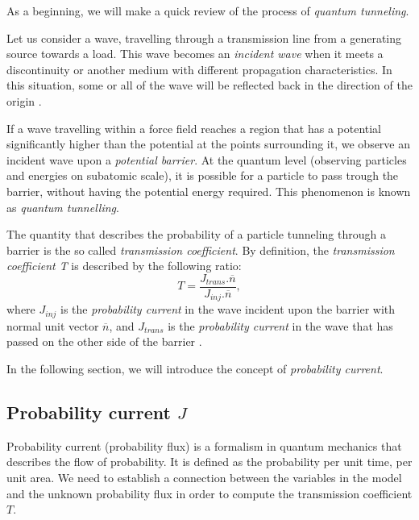 \documentclass[12pt,a4paper,onecolumn]{article}
\theoremstyle{definition}
\theoremstyle{plain}
\begin{document}
As a beginning, we  will make a quick review of the process of \textit{quantum tunneling}.

Let us consider a wave, travelling through a transmission line from a generating source towards a load. This wave becomes an \textit{incident wave} when it meets a discontinuity or another medium with different propagation characteristics. In this situation, some or all of the wave will be reflected back in the direction of the origin \cite{IncidentWave}.

If a wave travelling within a force field reaches a region that has a potential significantly higher than the potential at the points surrounding it, we observe an incident wave upon a \textit{potential barrier}. At the quantum level (observing particles and energies on subatomic scale), it is possible for a particle to pass trough the barrier, without having the potential energy required. This phenomenon is known as \textit{quantum tunnelling}.

The quantity that describes the probability of a particle tunneling through a barrier is the so called \textit{transmission coefficient}. By definition, the \textit{transmission coefficient T} is described by the following ratio:
\begin{equation*}
        T=\frac{J_{trans}.\overline{n}}{J_{inj}.\overline{n}},
\end{equation*}
where $J_{inj}$ is the \textit{probability current} in the wave incident upon the barrier with normal unit vector $\overline{n}$, and $J_{trans}$ is the \textit{probability current} in the wave that has passed on the other side of the barrier \cite{wikiTransmCoeff}.

In the following section, we will introduce the concept of \textit{probability current}.


\subsection{Probability current $J$}
Probability current (probability flux) is a formalism in quantum mechanics that describes the flow of probability. It is defined as the probability per unit time, per unit area. 
We need to establish a connection between the variables in the model and the unknown probability flux in order to compute the transmission coefficient $T$.
\end{document}
